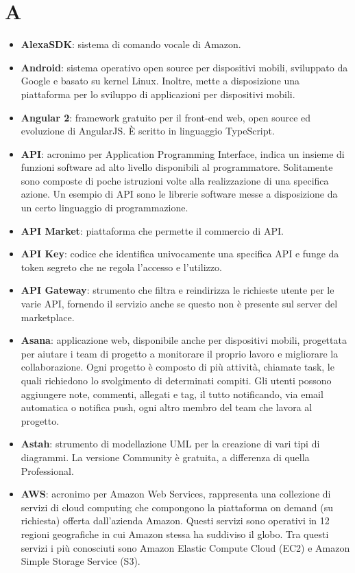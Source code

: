 \section{A}
\begin{itemize}
	\item \textbf{AlexaSDK}: sistema di comando vocale di Amazon.
	\item \textbf{Android}: sistema operativo open source per dispositivi mobili, sviluppato da Google e basato su kernel Linux. Inoltre, mette a disposizione una piattaforma per lo sviluppo di applicazioni per dispositivi mobili.
	\item \textbf{Angular 2}: framework gratuito per il front-end web, open source ed evoluzione di AngularJS. \MakeUppercase{è} scritto in linguaggio TypeScript.
	\item \textbf{API}: acronimo per Application Programming Interface, indica un insieme di funzioni software ad alto livello disponibili al programmatore. Solitamente sono composte di poche istruzioni volte alla realizzazione di una specifica azione. Un esempio di API sono le librerie software messe a disposizione da un certo linguaggio di programmazione.
	\item \textbf{API Market}: piattaforma che permette il commercio di API.
	\item \textbf{API Key}: codice che identifica univocamente una specifica API e funge da token segreto che ne regola l'accesso e l'utilizzo.
	\item \textbf{API Gateway}: strumento che filtra e reindirizza le richieste utente per le varie API, fornendo il servizio anche se questo non è presente sul server del marketplace. 
	\item \textbf{Asana}: applicazione web, disponibile anche per dispositivi mobili, progettata per aiutare i team di progetto a monitorare il proprio lavoro e migliorare la collaborazione. Ogni progetto è composto di più attività, chiamate task, le quali richiedono lo svolgimento di determinati compiti. Gli utenti possono aggiungere note, commenti, allegati e tag, il tutto notificando, via email automatica o notifica push, ogni altro membro del team che lavora al progetto.
	\item \textbf{Astah}: strumento di modellazione UML per la creazione di vari tipi di diagrammi. La versione Community è gratuita, a differenza di quella Professional.
	\item \textbf{AWS}: acronimo per Amazon Web Services, rappresenta una collezione di servizi di cloud computing che compongono la piattaforma on demand (su richiesta) offerta dall'azienda Amazon. Questi servizi sono operativi in 12 regioni geografiche in cui Amazon stessa ha suddiviso il globo. Tra questi servizi i più conosciuti sono Amazon Elastic Compute Cloud (EC2) e Amazon Simple Storage Service (S3).

\end{itemize}
